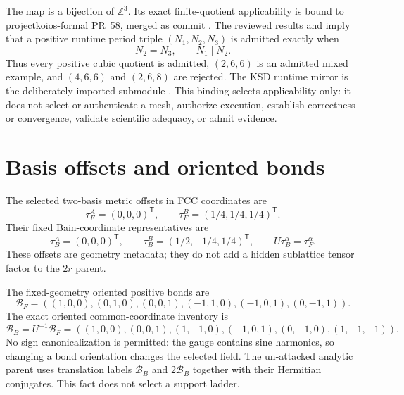 \documentclass[11pt]{article}
\newcommand{\ZZ}{\mathbb Z}
\newcommand{\BB}{\mathcal B_B}
\newcommand{\BF}{\mathcal B_F}
\begin{document}
The map is a bijection of $\ZZ^3$.  Its exact finite-quotient applicability is bound to
projectkoios-formal PR~58, merged as commit
.  The reviewed results
 and
 imply that a positive runtime
period triple $(N_1,N_2,N_3)$ is admitted exactly when
\begin{equation}
 N_2=N_3,\qquad N_1\mid N_2.
\end{equation}
Thus every positive cubic quotient is admitted, $(2,6,6)$ is an admitted mixed example,
and $(4,6,6)$ and $(2,6,8)$ are rejected.  The KSD runtime mirror is the deliberately
imported submodule
.  This binding selects
applicability only: it does not select or authenticate a mesh, authorize execution,
establish correctness or convergence, validate scientific adequacy, or admit evidence.

\section{Basis offsets and oriented bonds}

The selected two-basis metric offsets in FCC coordinates are
\begin{equation}
 \tau_F^A=(0,0,0)^{\mathsf T},
 \qquad
 \tau_F^B=(1/4,1/4,1/4)^{\mathsf T}.
\end{equation}
Their fixed Bain-coordinate representatives are
\begin{equation}
 \tau_B^A=(0,0,0)^{\mathsf T},
 \qquad
 \tau_B^B=(1/2,-1/4,1/4)^{\mathsf T},
 \qquad
 U\tau_B^\alpha=\tau_F^\alpha.
\end{equation}
These offsets are geometry metadata; they do not add a hidden sublattice tensor factor
to the $2r$ parent.

The fixed-geometry oriented positive bonds are
\begin{equation}
 \BF=((1,0,0),(0,1,0),(0,0,1),(-1,1,0),(-1,0,1),(0,-1,1)).
\end{equation}
The exact oriented common-coordinate inventory is
\begin{equation}
 \BB=U^{-1}\BF
 =((1,0,0),(0,0,1),(1,-1,0),(-1,0,1),(0,-1,0),(1,-1,-1)).
\end{equation}
No sign canonicalization is permitted: the gauge contains sine harmonics, so changing a
bond orientation changes the selected field.  The un-attacked analytic parent uses
translation labels $\BB$ and $2\BB$ together with their Hermitian conjugates.  This fact
does not select a support ladder.
\end{document}
